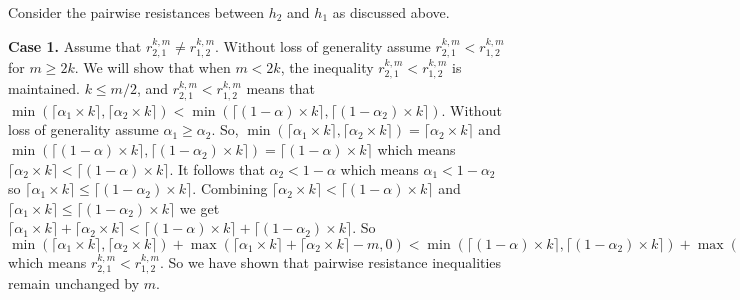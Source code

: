\documentclass[11.5pt]{article}
\begin{document}
Consider the pairwise resistances between $h_2$ and $h_1$ as discussed above. 

{\bf Case 1.} Assume that $r^{k,m}_{2,1} \neq r^{k,m}_{1,2}$. Without loss of generality assume $r^{k,m}_{2,1} < r^{k,m}_{1,2}$ for $m \geq 2k$. We will show that when $m < 2k$, the inequality $r^{k,m}_{2,1} < r^{k,m}_{1,2}$ is maintained. $k \leq m/2$, and $r^{k,m}_{2,1} < r^{k,m}_{1,2}$ means that $\min(\lceil \alpha_1 \times k \rceil,\lceil \alpha_2 \times k \rceil) < \min(\lceil (1-\alpha) \times k \rceil,\lceil (1-\alpha_2) \times k \rceil)$. Without loss of generality assume $\alpha_1 \geq \alpha_2$. So, $\min(\lceil \alpha_1 \times k \rceil,\lceil \alpha_2 \times k \rceil) = \lceil \alpha_2 \times k \rceil$ and $\min(\lceil (1-\alpha) \times k \rceil,\lceil (1-\alpha_2) \times k \rceil) = \lceil (1-\alpha) \times k \rceil$ which means $\lceil \alpha_2 \times k \rceil < \lceil (1-\alpha) \times k \rceil$. It follows that $\alpha_2< 1- \alpha$ which means $\alpha_1< 1 - \alpha_2$ so $\lceil \alpha_1 \times k \rceil \leq \lceil (1 - \alpha_2) \times k \rceil$. Combining $\lceil \alpha_2 \times k \rceil < \lceil (1-\alpha) \times k \rceil$ and  $\lceil \alpha_1 \times k \rceil \leq \lceil (1 - \alpha_2) \times k \rceil$ we get $\lceil \alpha_1 \times k \rceil+\lceil \alpha_2 \times k \rceil < \lceil (1-\alpha) \times k \rceil+\lceil (1-\alpha_2) \times k \rceil$. So $\min(\lceil \alpha_1 \times k \rceil,\lceil \alpha_2 \times k \rceil)+\max(\lceil \alpha_1 \times k \rceil+\lceil \alpha_2 \times k \rceil-m,0) < \min(\lceil (1-\alpha) \times k \rceil,\lceil (1-\alpha_2) \times k \rceil)+\max(\lceil (1-\alpha) \times k \rceil+\lceil (1-\alpha_2) \times k \rceil-m,0)$ which means $r^{k,m}_{2,1} < r^{k,m}_{1,2}$. So we have shown that pairwise resistance inequalities remain unchanged by $m$. 
\end{document}
